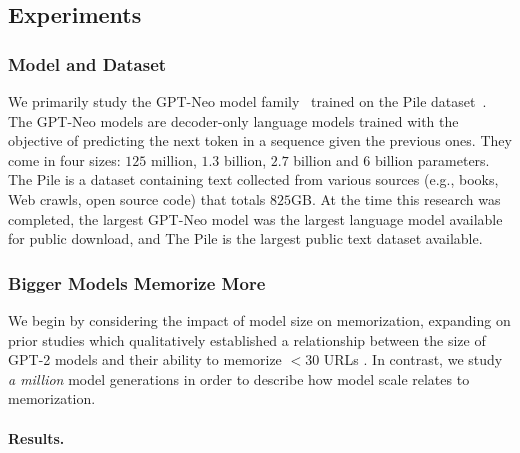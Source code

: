 \subsection{Experiments}
\label{section:scaling_laws_experiments}

\subsubsection{Model and Dataset}
We primarily study the GPT-Neo model family~\citep{gpt-neo,gpt-j} trained on the Pile dataset~\citep{gao2020pile}.
The GPT-Neo models are decoder-only language models 
trained with the objective of predicting the next token in a sequence given the previous ones.
They come in four sizes: $125$ million, $1.3$ billion, $2.7$ billion and $6$ billion parameters. 
The Pile is a dataset containing text collected from various sources (e.g., books, Web crawls, open source code) that totals $825$GB.
%
At the time this research was completed, the largest GPT-Neo model was the largest language model available for public download, and The Pile is the largest public text dataset available.

\subsubsection{Bigger Models Memorize More}
\label{sec:modelsize}
We begin by considering the impact of model size on memorization,
expanding on prior studies which qualitatively established a relationship between the size of GPT-2 models and their
ability to memorize $<$30 URLs \citep{carlini2020extracting}.
%
In contrast, we study \emph{a million} model generations in order to describe
how model scale relates to memorization.

\paragraph{Results.}


